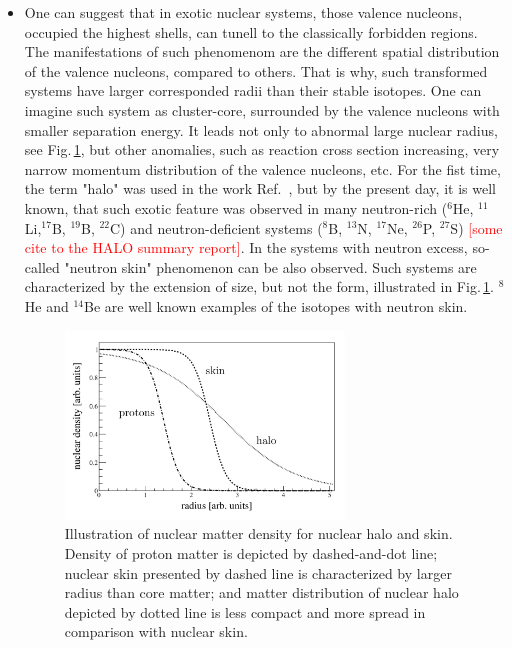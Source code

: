 \begin{itemize}
	\item 
	One can suggest that in exotic nuclear systems, those valence nucleons, occupied the highest shells, can tunell to the classically forbidden regions. 
	The manifestations of such phenomenom are the different spatial distribution of the valence nucleons, compared to others. 
	That is why, such transformed systems have larger corresponded radii than their stable isotopes.
	One can imagine such system as cluster-core, surrounded by the valence nucleons with smaller separation energy.
	It leads not only to abnormal large nuclear radius, see Fig.\,\ref{fig:halo_skin_density}, but other anomalies, such as reaction cross section increasing, very narrow momentum distribution of the valence nucleons, etc.
	For the fist time, the term "halo" was used in the work Ref.\ \cite{Hansen:1987}, but by the present day, it is well known, that such exotic feature was observed in many neutron-rich ($^{6}$He, $^{11}$Li,$^{17}$B, $^{19}$B, $^{22}$C) and neutron-deficient systems ($^{8}$B, $^{13}$N, $^{17}$Ne, $^{26}$P, $^{27}$S) \textcolor{red}{[some cite to the HALO summary report]}.
	In the systems with neutron excess, so-called "neutron skin" phenomenon can be also observed.
	Such systems are characterized by the extension of size, but not the form, illustrated in Fig.\,\ref{fig:halo_skin_density}. 
	$^{8}$He and $^{14}$Be are well known examples of the isotopes with neutron skin.
	
	\begin{figure}[t]
		\begin{center}
			\includegraphics[width=0.7\textwidth]{figures/densityDistr.png}
		\end{center}
		\caption{
			Illustration of nuclear matter density for nuclear halo and skin. 
			Density of proton matter is depicted by dashed-and-dot line; nuclear skin presented by dashed
			line is characterized by larger radius than core matter; and matter distribution of
			nuclear halo depicted by dotted line is less compact and more spread in comparison
			with nuclear skin.}
		\label{fig:halo_skin_density}
	\end{figure}
	

\end{itemize}
